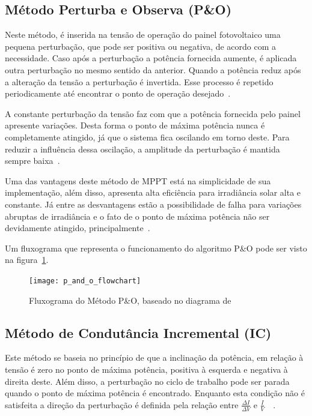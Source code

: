 \documentclass[
	12pt,				%
	openright,			%
	twoside,			%
	a4paper,			%
	english,			%
	french,				%
	spanish,			%
	brazil,				%
	]{abntex2}
\begin{document}
\subsection{Método Perturba e Observa (P\&O)}

Neste método, é inserida na tensão de operação do painel fotovoltaico uma pequena perturbação, que pode ser positiva ou negativa, de acordo com a necessidade. Caso após a perturbação a potência fornecida aumente, é aplicada outra perturbação no mesmo sentido da anterior. Quando a potência reduz após a alteração da tensão a perturbação é invertida. Esse processo é repetido periodicamente até encontrar o ponto de operação desejado~\cite{Talha_MPPT}.

A constante perturbação da tensão faz com que a potência fornecida pelo painel apresente variações. Desta forma o ponto de máxima potência nunca é completamente atingido, já que o sistema fica oscilando em torno deste. Para reduzir a influência dessa oscilação, a amplitude da perturbação é mantida sempre baixa~\cite{MPPT_P&O_IC}.

Uma das vantagens deste método de MPPT está na simplicidade de sua implementação, além disso, apresenta alta eficiência para irradiância solar alta e constante. Já entre as desvantagens estão a possibilidade de falha para variações abruptas de irradiância e o fato de o ponto de máxima potência não ser devidamente atingido, principalmente~\cite{MPPT_P&O_IC}.

Um fluxograma que representa o funcionamento do algoritmo P\&O pode ser visto na figura~\ref{fig:PeO_Flux}.

\begin{figure}[H]
	\begin{center}
		\texttt{[image: p\_and\_o\_flowchart]}
		\caption{Fluxograma do Método P\&O, baseado no diagrama de }
		\label{fig:PeO_Flux}
	\end{center}
\end{figure}

\subsection{Método de Condutância Incremental (IC)}

Este método se baseia no princípio de que a inclinação da potência, em relação à tensão é zero no ponto de máxima potência, positiva à esquerda e negativa à direita deste. Além disso, a perturbação no ciclo de trabalho pode ser parada quando o ponto de máxima potência é encontrado. Enquanto esta condição não é satisfeita a direção da perturbação é definida pela relação entre $\frac{\Delta I}{\Delta V}$ e $\frac{I}{V}$~\cite{Talha_MPPT}~\cite{MPPT_P&O_IC}.
\end{document}
